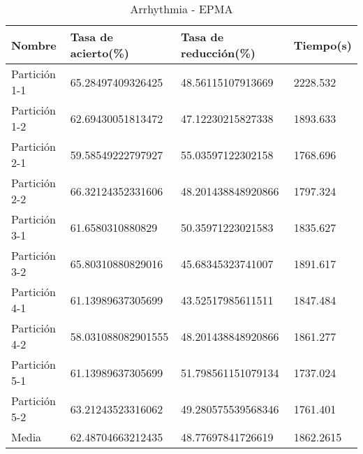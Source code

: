 \begin{table}[H]
	\centering
	\begin{tabular}{l|lll}
		Nombre        & Tasa de acierto(\%) & Tasa de reducción(\%) & Tiempo(s) \\ \hline
		Partición 1-1 & 65.28497409326425   & 48.56115107913669     & 2228.532  \\
		Partición 1-2 & 62.69430051813472   & 47.12230215827338     & 1893.633  \\
		Partición 2-1 & 59.58549222797927   & 55.03597122302158     & 1768.696  \\
		Partición 2-2 & 66.32124352331606   & 48.201438848920866    & 1797.324  \\
		Partición 3-1 & 61.6580310880829    & 50.35971223021583     & 1835.627  \\
		Partición 3-2 & 65.80310880829016   & 45.68345323741007     & 1891.617  \\
		Partición 4-1 & 61.13989637305699   & 43.52517985611511     & 1847.484  \\
		Partición 4-2 & 58.031088082901555  & 48.201438848920866    & 1861.277  \\
		Partición 5-1 & 61.13989637305699   & 51.798561151079134    & 1737.024  \\
		Partición 5-2 & 63.21243523316062   & 49.280575539568346    & 1761.401  \\ \hline
		Media         & 62.48704663212435   & 48.77697841726619     & 1862.2615
	\end{tabular}
	\caption{Arrhythmia - EPMA}
	\label{ARRH-EPMA}
\end{table}